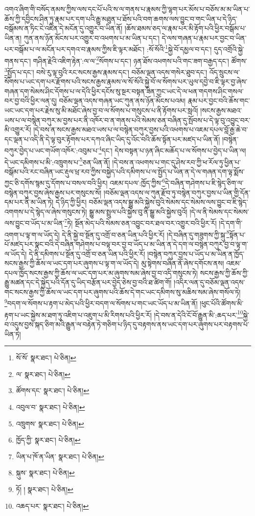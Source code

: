 འགའ་ཞིག་གི་བསོད་ནམས་ཀྱིས་ལས་དང་པོ་པའི་ས་ལ་གནས་པ་རྣམས་ཀྱི་ལྷག་པར་མོས་པ་བཅོས་མ་མ་ཡིན་པ་ཆོས་ཀྱི་དབྱིངས་ཤིན་ཏུ་རྣམ་པར་དག་པའི་རྒྱུ་མཐུན་པ་ཐོས་པའི་བག་ཆགས་ལས་བྱུང་བ་གང་ཡིན་པ་དེ་ཉིད་བསྒོམས་ན་ཏིང་ངེ་འཛིན་དེ་མངོན་དུ་འགྱུར་བ་ཡིན་ནོ། །ཆོས་ཐམས་ཅད་ལ་རྣམ་པར་མི་རྟོག་པའི་ཕྱིར་བསྒོམ་པ་ཡིན་ན། ཀུན་ནས་ཉོན་མོངས་པར་འགྱུར་བ་འཕགས་པ་མ་ཡིན་པ་དང་། དེ་ལས་གཞན་པ་རྣམ་པར་བྱང་བ་ཡིན་པར་བསྒོམ་པ་ལ་མངོན་པར་དགའ་བ་རྣམས་ཀྱིས་ཇི་ལྟར་མཐོང་། :སོ་སོའི་\footnote{སོ་སོ་  སྣར་ཐང་།  པེ་ཅིན། }སྐྱེ་བོ་དམྱལ་བ་དང་། དུད་འགྲོའི་སྐྱེ་གནས་དང་། གཤིན་རྗེའི་འཇིག་རྟེན་:ལ་ལ་\footnote{ལ་  སྣར་ཐང་།  པེ་ཅིན། }སོགས་པ་དང་། ཉན་ཐོས་འཕགས་པའི་གང་ཟག་བརྒྱད་དང་། ཚོགས་\footnote{ཚོགས་དང་  སྣར་ཐང་།  པེ་ཅིན། }སྤྱོད་པ་དང་། བསེ་རུ་ལྟ་བུའི་རང་སངས་རྒྱས་རྣམས་དང་། བཅོམ་ལྡན་འདས་གསེར་ཐུབ་དང་། འོད་སྲུངས་ལ་སོགས་པ་ཡང་དག་པར་རྫོགས་པའི་སངས་རྒྱས་རྣམས་ལ་སོ་སོའི་སྐྱེ་བོ་ལ་སོགས་པར་ཡུལ་དབྱེ་བ་ཇི་ལྟར་བྱ་ཞེས་གཞན་དག་སེམས་ཤིང་དོགས་པ་ལ་དེའི་ཕྱིར་དངོས་སུ་སྔར་བསྟན་ཟིན་ཀྱང་ཡང་དེ་ལ་ཕན་གདགས་ཤིང་གསལ་བར་བྱ་བའི་ཕྱིར་ལན་དུ། བཅོམ་ལྡན་འདས་གཞན་ཡང་ཀུན་ནས་ཉོན་མོངས་པའམ། རྣམ་པར་བྱང་བའི་ཆོས་གང་ཡང་ཡང་དག་པར་རྗེས་སུ་མི་མཐོང་ཞེས་བྱ་བ་ལ་སོགས་པ་གསུངས་པ་ནི་རྟོགས་པར་སླའོ། །སངས་རྒྱས་མཐའ་ཡས་པ་ལ་བསྙེན་བཀུར་མ་བྱས་པར་ནི་འཁོར་བ་ན་གནས་པའི་སེམས་ཅན་བཞིན་དུ་སྤོབས་པ་དེ་ལྟ་བུ་འབྱུང་བར་མི་འགྱུར་རོ། །དེ་བས་ན་སངས་རྒྱས་མཐའ་ཡས་པ་ལ་བསྙེན་བཀུར་བྱས་པའི་འཕགས་པ་འཇམ་དཔལ་བློ་རྒྱ་ཆེ་བ་དང་ལྡན་པ་འདི་ནི་དེ་ལྟ་བུར་རྟོགས་པར་དཀའ་ཞིང་ཡིད་དུ་འོང་བའི་ཆོས་སྟོན་པར་མཛད་པ་ཡིན་ནོ། །བསྙེན་བཀུར་བྱེད་པ་ཡང་གཡོག་འཁོར་:འབུམ་པ་\footnote{འབུལ་བ་  སྣར་ཐང་།  པེ་ཅིན། }དང་། དེས་བསྟན་པ་ཉན་ཞིང་མཆོད་པ་ལ་སོགས་པ་བྱེད་པ་ཡིན་ལ། དེ་ཡང་དམིགས་པ་མི་:འཁྲུགས་པ་\footnote{འཁྲུགས་  སྣར་ཐང་།  པེ་ཅིན། }ཅན་ཡིན་ནོ། །དེ་བས་ན་འཕགས་པ་གང་དུ་ཤེས་རབ་ཀྱི་ཕ་རོལ་ཏུ་ཕྱིན་པ་བསྒོམ་པའི་རང་བཞིན་ཡང་རྡུལ་ཕྲ་རབ་ཀྱིས་བསྐྱེད་པའི་དམིགས་པ་ལ་སྤྱོད་པ་ཡིན་ན་དེ་ལ་གཞན་དག་ལྟ་སྨོས་ཀྱང་ཅི་དགོས་སྙམ་དུ་དོགས་པ་བསལ་བའི་ཕྱིར། འཇམ་དཔལ་:ཁྱོད་ཀྱིས་\footnote{ཁྱོད་ཀྱི་  སྣར་ཐང་།  པེ་ཅིན། }དེ་བཞིན་གཤེགས་པ་ཇི་སྙེད་ཅིག་ལ་བསྙེན་བཀུར་བྱས་ཞེས་རྒྱས་པར་གསུངས་སོ། །བཅོམ་ལྡན་འདས་ལ་ཀུན་རྫོབ་ཏུ་བསྙེན་བཀུར་བྱས་པ་ཡིན་གྱི་དོན་དམ་པར་ནི་མ་ཡིན་ཏེ། དེ་ཉིད་ཀྱི་ཕྱིར། བཅོམ་ལྡན་འདས་སྒྱུ་མའི་སྐྱེས་བུའི་སེམས་དང་སེམས་ལས་བྱུང་བ་ཇི་སྙེད་འགགས་པ་དེ་སྙེད་ལ་ཞེས་གསུངས་ཏེ། སྒྱུ་མས་སྤྲུལ་པའི་སྐྱེས་བུ་ནི་སྒྱུ་མའི་སྐྱེས་བུའོ། །དེ་ལ་ནི་སེམས་དང་སེམས་ལས་བྱུང་བ་ཡོད་པ་མ་ཡིན་\footnote{ཡིན་པ་ཁོ་ན་ཡིན་  སྣར་ཐང་།  པེ་ཅིན། }ཏེ། སྔོན་མེད་པའི་སེམས་ཅན་འབྱུང་བར་ཐལ་བར་འགྱུར་བའི་ཕྱིར་རོ། །དེ་དག་གི་འགག་པ་ལྟ་ག་ལ་ཡོད་དེ། དེ་ནི་སྐྱེ་བ་སྔོན་དུ་འགྲོ་བ་ཅན་ཡིན་པའི་ཕྱིར་རོ། །དེ་བཞིན་དུ་གཟུགས་ཀྱི་སྐུ་\footnote{སྐུས་  སྣར་ཐང་།  པེ་ཅིན། }སྟོན་པ་པོ་མཛད་པར་སྣང་བའི་དེ་བཞིན་གཤེགས་པ་བལྟ་བར་བྱ་བ་ཡོད་པ་མ་ཡིན་ན་དེ་དག་ལ་བསྙེན་བཀུར་བྱ་བ་ལྟ་ག་ལ་ཡོད་དེ། དེ་ནི་དམིགས་པ་སྔོན་དུ་འགྲོ་བ་ཅན་ཡིན་པའི་ཕྱིར་རོ། །བསྙེན་བཀུར་བྱས་པ་ཡོད་པ་མ་ཡིན་ན་ཁྱོད་སངས་རྒྱས་ཀྱི་ཆོས་ལ་ཡང་དག་པར་ཞུགས་པ་ལྟ་ག་ལ་ཡོད་དེ། མུ་སྟེགས་བཞིན་ནོ་ཞེས་དགོངས་ནས། འཇམ་དཔལ་ཁྱོད་སངས་རྒྱས་ཀྱི་ཆོས་ལ་ཡང་དག་པར་མ་ཞུགས་སམ་ཞེས་བྱ་བ་འདི་གསུངས་ཏེ། སངས་རྒྱས་ཀྱི་ཆོས་ཀྱི་རྒྱུ་མཚན་དང་དེ་སྐྱེད་པའི་དོན་དུ་ཡིད་བརྩོན་པར་བྱེད་ཅེས་བྱ་བའི་ཐ་ཚིག་གོ། །འདིར་ལན་དུ་བཅོམ་ལྡན་འདས་གང་སངས་རྒྱས་ཀྱི་ཆོས་ལ་ཡང་དག་པར་ཞུགས་པའི་ཆོས་དེ་གང་ཡང་དམིགས་སུ་མཆིས་སམ་ཞེས་གསོལ་ཏེ། \footnote{ཏོ། །   སྣར་ཐང་།  པེ་ཅིན། }བདག་ལ་སོགས་པ་རྟག་པ་མེད་པའི་ཕྱིར་བདག་ལ་སོགས་པ་གང་ཡང་ཡོད་པ་མ་ཡིན་ནོ། །ཕུང་པོའི་ཚོགས་མི་རྟག་པ་ཡང་སྐྱེས་མ་ཐག་ཏུ་འཇིག་པ་འཇུག་པ་མི་རིགས་པའི་ཕྱིར་རོ། །དེ་བས་ན་དེའི་ངོ་བོ་རྒྱུན་མི་:ཆད་པར་\footnote{འཆད་པར་  སྣར་ཐང་།  པེ་ཅིན། }སྐྱེ་བ་འདུས་བྱས་སྐད་ཅིག་མའི་རྒྱུན་ལ་བརྟེན་ཏེ་གཅིག་པ་ཉིད་དུ་བརྟགས་ནས་ཡང་དག་པར་ཞུགས་པར་བརྟགས་པ་ཡིན་ཏེ། 